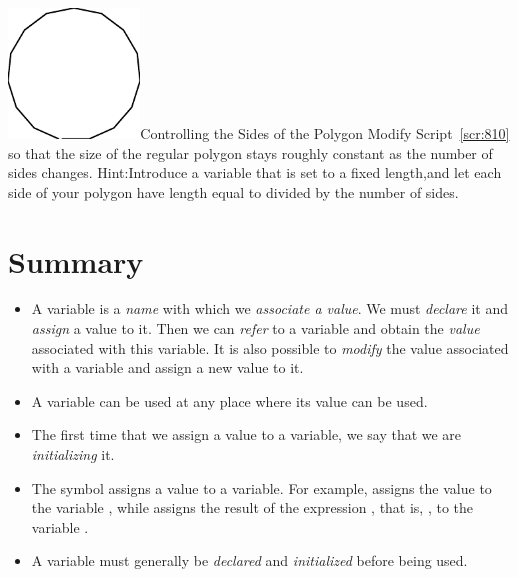 \documentclass[a4paper,10pt,twoside]{book}
\begin{document}
\begin{exofigwithsizeandtitle}[0.65]{\includegraphics[width=3.5cm]{varSameLength}}{Controlling the Sides of the Polygon}
Modify Script~\ref{scr:810} so that the size of the regular polygon stays roughly constant as the number of sides changes. 
Hint:Introduce a variable  that is set to a fixed length,and let each side of your polygon have length equal to  divided by the number of sides.
\end{exofigwithsizeandtitle}


\section{Summary} 

\begin{itemize}
	\item A variable is a \emph{name} with which we \emph{associate a value}. We must \emph{declare} it and \emph{assign} a value to it. Then we can \emph{refer} to a variable and obtain the \emph{value} associated with this variable. It is also possible to \emph{modify} the value associated with a variable and assign 
a new value to it. 
\item A variable can be used at any place where its value can be used. 
\item The first time that we assign a value to a variable, we say that we are \emph{initializing} it. 
\item The symbol \ct{:=} assigns a value to a variable. For example,  assigns the 
value  to the variable , while  assigns the result of 
the expression , that is, , to the variable . 
\item A variable must generally be \emph{declared} and \emph{initialized} before being used. 
\end{itemize}








\ifx\wholebook\relax\else
    
\end{document}
